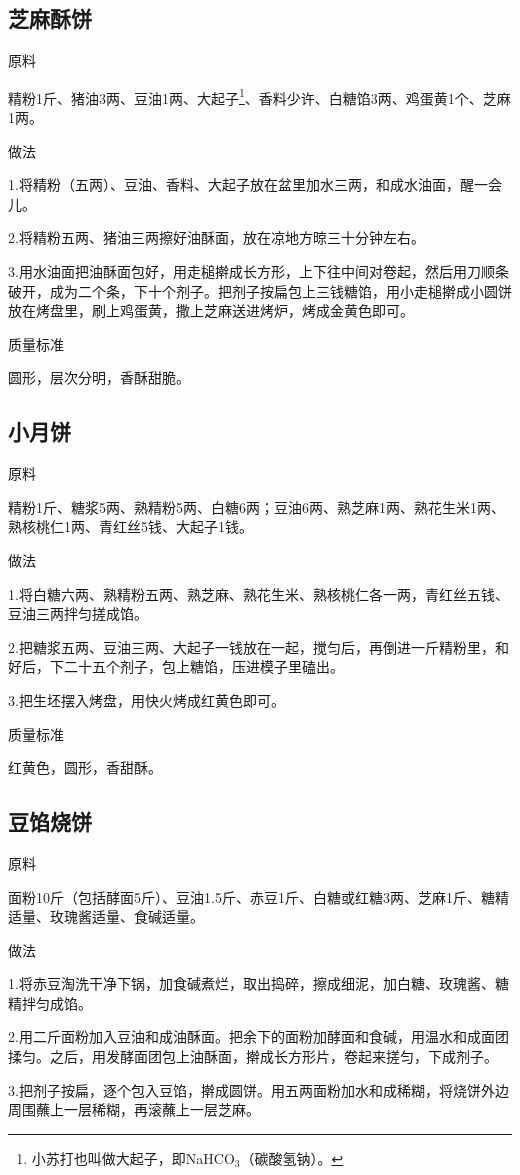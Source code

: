 \documentclass{ctexbook}
\begin{document}
\subsection{芝麻酥饼}
原料

精粉1斤、猪油3两、豆油1两、大起子\footnote{小苏打也叫做大起子，即NaHCO$_3$（碳酸氢钠）。}、香料少许、白糖馅3两、鸡蛋黄1个、芝麻1两。

做法

1.将精粉（五两）、豆油、香料、大起子放在盆里加水三两，和成水油面，醒一会儿。

2.将精粉五两、猪油三两擦好油酥面，放在凉地方晾三十分钟左右。

3.用水油面把油酥面包好，用走槌擀成长方形，上下往中间对卷起，然后用刀顺条破开，成为二个条，下十个剂子。把剂子按扁包上三钱糖馅，用小走槌擀成小圆饼放在烤盘里，刷上鸡蛋黄，撒上芝麻送进烤炉，烤成金黄色即可。

质量标准

圆形，层次分明，香酥甜脆。
\subsection{小月饼}
原料

精粉1斤、糖浆5两、熟精粉5两、白糖6两；豆油6两、熟芝麻1两、熟花生米1两、熟核桃仁1两、青红丝5钱、大起子1钱。

做法

1.将白糖六两、熟精粉五两、熟芝麻、熟花生米、熟核桃仁各一两，青红丝五钱、豆油三两拌匀搓成馅。

2.把糖浆五两、豆油三两、大起子一钱放在一起，搅匀后，再倒进一斤精粉里，和好后，下二十五个剂子，包上糖馅，压进模子里磕出。

3.把生坯摆入烤盘，用快火烤成红黄色即可。

质量标准

红黄色，圆形，香甜酥。
\subsection{豆馅烧饼}
原料

面粉10斤（包括酵面5斤）、豆油1.5斤、赤豆1斤、白糖或红糖3两、芝麻1斤、糖精适量、玫瑰酱适量、食碱适量。

做法

1.将赤豆淘洗干净下锅，加食碱煮烂，取出捣碎，擦成细泥，加白糖、玫瑰酱、糖精拌匀成馅。

2.用二斤面粉加入豆油和成油酥面。把余下的面粉加酵面和食碱，用温水和成面团揉匀。之后，用发酵面团包上油酥面，擀成长方形片，卷起来搓匀，下成剂子。

3.把剂子按扁，逐个包入豆馅，擀成圆饼。用五两面粉加水和成稀糊，将烧饼外边周围蘸上一层稀糊，再滚蘸上一层芝麻。
\end{document}
